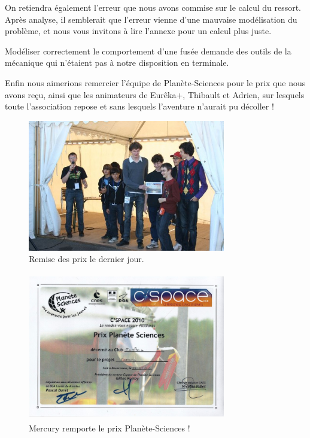 \documentclass[a4paper,12pt]{scrartcl}
\begin{document}
	  On retiendra également l'erreur que nous avons commise sur le calcul du ressort. Après analyse, il semblerait que l'erreur vienne d'une mauvaise modélisation du problème, et nous vous invitons à lire l'annexe pour un calcul plus juste.

	  Modéliser correctement le comportement d'une fusée demande des outils de la mécanique qui n'étaient pas à notre disposition en terminale.
	  
	  Enfin nous aimerions remercier l'équipe de Planète-Sciences pour le prix que nous avons reçu, ainsi que les animateurs de Eurêka+, Thibault et Adrien, sur lesquels toute l'association repose et sans lesquels l'aventure n'aurait pu décoller !

	  
	      \begin{figure}[H]
		    \begin{center}
		      \caption{Remise des prix le dernier jour.}
		      \includegraphics[height=217px, width=326px]{Photos_Mercury/remise_des_prix.jpg}
		    \end{center}
	      \end{figure}
	      \begin{figure}[H]
		    \begin{center}
		      \caption{Mercury remporte le prix Planète-Sciences !}
		      \includegraphics[height=244px, width=326px]{Photos_Mercury/Mercury_Prix_PS_2010.jpg}
		    \end{center}
	      \end{figure}
	\newpage
\end{document}
